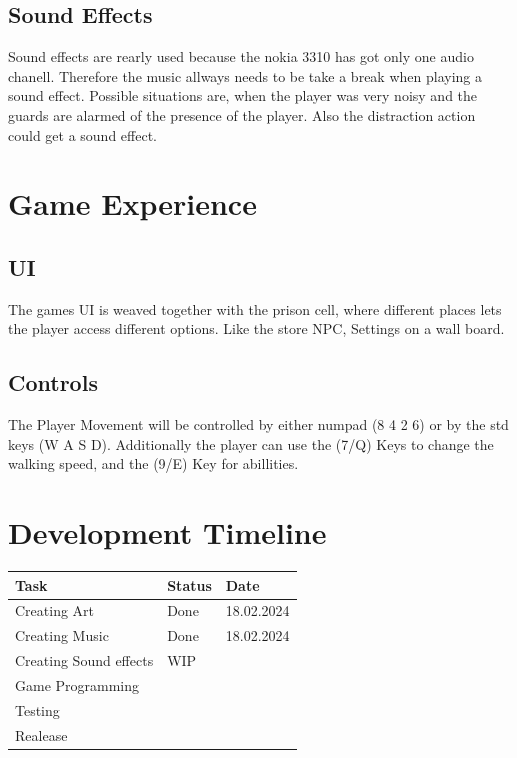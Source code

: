 \documentclass[12pt, a4paper]{article}
\begin{document}
{        \subsection{Sound Effects}
            Sound effects are rearly used because the nokia 3310
            has got only one audio chanell. Therefore the music 
            allways needs to be take a break when playing a sound
            effect. Possible situations are, when the player was very noisy
            and the guards are alarmed of the presence of the player. Also
            the distraction action could get a sound effect.

    \section{Game Experience}
    
        \subsection{UI}
            The games UI is weaved together with the prison cell,
            where different places lets the player access different
            options. Like the store NPC, Settings on a wall board.
            
        \subsection{Controls}
            The Player Movement will be controlled by either numpad (8 4 2 6)
            or by the std keys (W A S D). Additionally the player can use the (7/Q)
            Keys to change the walking speed, and the (9/E) Key for abillities.

    \section{Development Timeline}
        \begin{table}[h]
            \centering
            \begin{tabular}{| m{4cm} | m{4cm} | m{4cm}|}\hline
                \textbf{Task} & \textbf{Status} & \textbf{Date}\\\hline\hline
                Creating Art & Done & 18.02.2024\\\hline
                Creating Music & Done & 18.02.2024\\\hline
                Creating Sound effects & WIP &\\\hline
                Game Programming  &  & \\\hline
                Testing & & \\\hline
                Realease & & \\\hline
            \end{tabular}
        \end{table}
}
\end{document}
